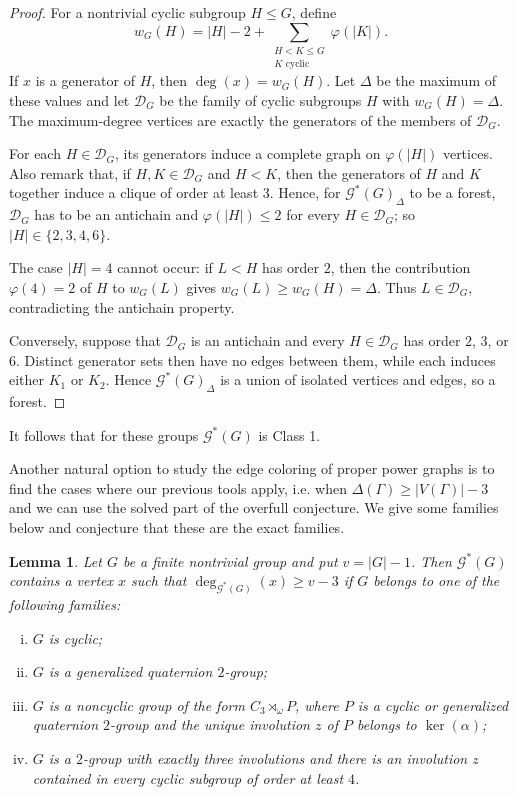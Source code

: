 \documentclass{article}
\newtheorem{lemma}[theorem]{Lemma}
\theoremstyle{definition}
\theoremstyle{indentclaim}
\theoremstyle{named}
\theoremstyle{named}
\begin{document}
\begin{proof}
For a nontrivial cyclic subgroup $H\leq G$, define
\[
w_G(H)=|H|-2+
\sum_{\substack{H<K\leq G\\ K\text{ cyclic}}}\varphi(|K|).
\]
If $x$ is a generator of $H$, then $\deg(x)=w_G(H)$. Let $\Delta$ be the maximum of these values and let $\mathcal D_G$ be the family of cyclic subgroups
$H$ with $w_G(H)=\Delta$. The maximum-degree vertices are exactly
the generators of the members of $\mathcal D_G$.

For each $H\in\mathcal D_G$, its generators induce a complete graph on
$\varphi(|H|)$ vertices. Also remark that, if $H,K\in\mathcal D_G$ and $H<K$, then the generators of $H$ and $K$ together induce a clique of order at least $3$.
Hence, for $\mathscr{G}^{*}(G)_{\Delta}$ to be a forest, $\mathcal D_G$ has to be an antichain and $\varphi(|H|)\leq2$ for every $H\in\mathcal D_G$; so $|H|\in\{2,3,4,6\}$.

The case $|H|=4$ cannot occur: if $L<H$ has order $2$, then the contribution
$\varphi(4)=2$ of $H$ to $w_G(L)$ gives $w_G(L)\geq w_G(H)=\Delta$.
Thus $L\in\mathcal D_G$, contradicting the antichain property.

Conversely, suppose that $\mathcal D_G$ is an antichain and every
$H\in\mathcal D_G$ has order $2$, $3$, or $6$. Distinct generator sets
then have no edges between them, while each induces either $K_1$ or $K_2$.
Hence $\mathscr{G}^{*}(G)_{\Delta}$ is a union of isolated vertices and edges, so a forest. 
\end{proof}

It follows that for these groups $\mathscr G^* (G)$ is Class 1. 

\medskip

Another natural option to study the edge coloring of proper power graphs is to find the cases where our previous tools apply, i.e. when $\Delta(\Gamma) \geq |V(\Gamma)| - 3$ and we can use the solved part of the overfull conjecture. We give some families below and conjecture that these are the exact families. 



\begin{lemma}\label{lem:families}
Let $G$ be a finite nontrivial group and put $v=|G|-1$. Then $\mathscr G^*(G)$ contains a
vertex $x$ such that $\deg_{\mathscr G^*(G)}(x)\geq v-3$
if $G$ belongs to one of the following families:
\begin{enumerate}[i)]
    \item $G$ is cyclic;
    \item $G$ is a generalized quaternion $2$-group;
    \item $G$ is a noncyclic group of the form $C_3\rtimes_\omega P$,
    where $P$ is a cyclic or generalized quaternion $2$-group and the unique
    involution $z$ of $P$ belongs to $\ker(\alpha)$;
    \item $G$ is a $2$-group with exactly three involutions and there is an
    involution $z$ contained in every cyclic subgroup of order at least $4$.
\end{enumerate}
\end{lemma}
\end{document}
